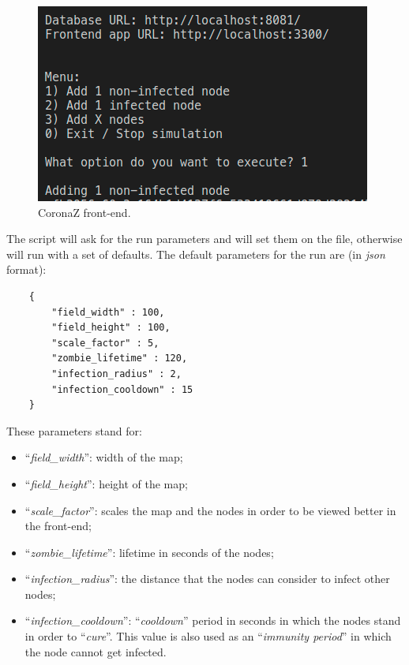 \documentclass[conference]{IEEEtran}
\begin{document}
	\begin{figure}[htbp]
		\centerline{\includegraphics[width=\linewidth]{img/script.png}}
		\caption{CoronaZ front-end.}
		\label{fig:frontend}
	\end{figure}

	The script will ask for the run parameters and will set them on the file, otherwise will run with a set of defaults.
	The default parameters for the run are (in \textit{json} format):
	\begin{lstlisting}
    {
        "field_width" : 100,
        "field_height" : 100,
        "scale_factor" : 5,
        "zombie_lifetime" : 120,
        "infection_radius" : 2,
        "infection_cooldown" : 15
    }
	\end{lstlisting}
	
	These parameters stand for:
	\begin{itemize}
		\item ``\textit{field\_width}'': width of the map;
		\item ``\textit{field\_height}'': height of the map;
		\item ``\textit{scale\_factor}'': scales the map and the nodes in order to be viewed better in the front-end;
		\item ``\textit{zombie\_lifetime}'': lifetime in seconds of the nodes;
		\item ``\textit{infection\_radius}'': the distance that the nodes can consider to infect other nodes;
		\item ``\textit{infection\_cooldown}'': ``\textit{cooldown}'' period in seconds in which the nodes stand in order to ``\textit{cure}''. This value is also used as an ``\textit{immunity period}'' in which the node cannot get infected.
	\end{itemize}
	
\end{document}
